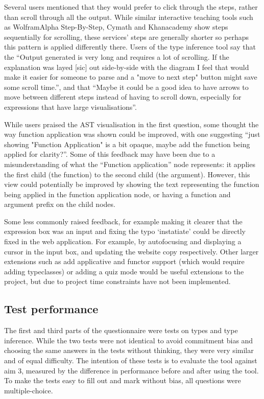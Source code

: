 \documentclass[a4paper,fleqn,twoside,12pt]{report}
\begin{document}
Several users mentioned that they would prefer to click through the steps, rather than scroll through all the output. While similar interactive teaching tools such as WolframAlpha Step-By-Step, Cymath and Khanacademy show steps sequentially for scrolling, these services’ steps are generally shorter so perhaps this pattern is applied differently there. Users of the type inference tool say that the “Output generated is very long and requires a lot of scrolling. If the explanation was layed [sic] out side-by-side with the diagram I feel that would make it easier for someone to parse and a "move to next step" button might save some scroll time.”, and that “Maybe it could be a good idea to have arrows to move between different steps instead of having to scroll down, especially for expressions that have large visualisations”.

While users praised the AST visualisation in the first question, some thought the way function application was shown could be improved, with one suggesting “just showing "Function Application" is a bit opaque, maybe add the function being applied for clarity?”. Some of this feedback may have been due to a misunderstanding of what the “Function application” node represents: it applies the first child (the function) to the second child (the argument). However, this view could potentially be improved by showing the text representing the function being applied in the function application node, or having a function and argument prefix on the child nodes.

Some less commonly raised feedback, for example making it clearer that the expression box was an input and fixing the typo ‘instatiate’ could be directly fixed in the web application. For example, by autofocusing and displaying a cursor in the input box, and updating the website copy respectively. Other larger extensions such as add applicative and functor support (which would require adding typeclasses) or adding a quiz mode would be useful extensions to the project, but due to project time constraints have not been implemented.
\subsection{Test performance}\label{id:h.cn0p90nrqrmi}
The first and third parts of the questionnaire were tests on types and type inference. While the two tests were not identical to avoid commitment bias and choosing the same answers in the tests without thinking, they were very similar and of equal difficulty. The intention of these tests is to evaluate the tool against aim 3, measured by the difference in performance before and after using the tool. To make the tests easy to fill out and mark without bias, all questions were multiple-choice.
\end{document}
